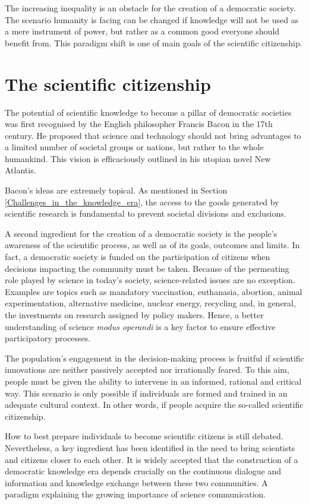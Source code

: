 The increasing inequality is an obstacle for the creation of a democratic society. The scenario humanity is facing can be changed if knowledge will not be used as a mere instrument of power, but rather as a common good everyone should benefit from. This paradigm shift is one of main goals of the scientific citizenship.

\section{The scientific citizenship} \label{The_scientific_citizenship}
The potential of scientific knowledge to become a pillar of democratic societies was first recognised by the English philosopher Francis Bacon in the 17th century. He proposed that science and technology should not bring advantages to a limited number of societal groups or nations, but rather to the whole humankind. This vision is efficaciously outlined in his utopian novel New Atlantis.

Bacon's ideas are extremely topical. As mentioned in Section \ref{Challenges_in_the_knowledge_era}, the access to the goods generated by scientific research is fundamental to prevent societal divisions and exclusions.

A second ingredient for the creation of a democratic society is the people's awareness of the scientific process, as well as of its goals, outcomes and limits. In fact, a democratic society is funded on the participation of citizens when decisions impacting the community must be taken. Because of the permeating role played by science in today's society, science-related issues are no exception. Examples are topics such as mandatory vaccination, euthanasia, abortion, animal experimentation, alternative medicine, nuclear energy, recycling and, in general, the investments on research assigned by policy makers. Hence, a better understanding of science \textit{modus operandi} is a key factor to ensure effective participatory processes.    

The population's engagement in the decision-making process is fruitful if scientific innovations are neither passively accepted nor irrationally feared. To this aim, people must be given the ability to intervene in an informed, rational and critical way. This scenario is only possible if individuals are formed and trained in an adequate cultural context. In other words, if people acquire the so-called scientific citizenship.

How to best prepare individuals to become scientific citizens is still debated. Nevertheless, a key ingredient has been identified in the need to bring scientists and citizens closer to each other. It is widely accepted that the construction of a democratic knowledge era depends crucially on the continuous dialogue and information and knowledge exchange between these two communities. A paradigm explaining the growing importance of science communication.

